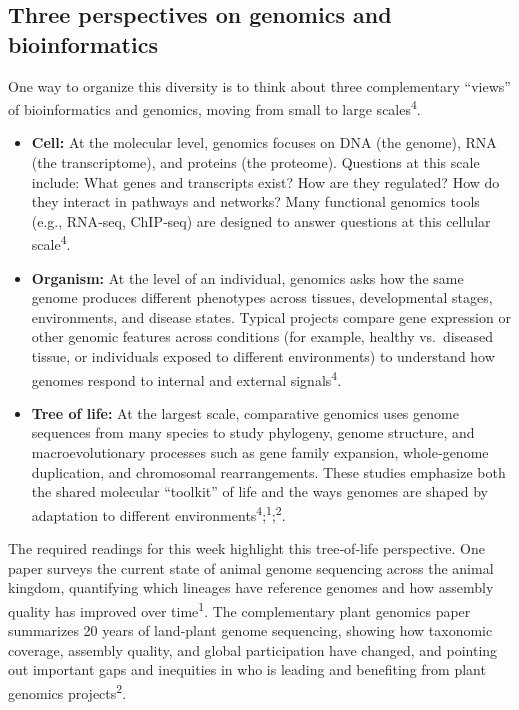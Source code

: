\documentclass[
  letterpaper,
  DIV=11,
  numbers=noendperiod]{scrreprt}
\begin{document}
\subsection{Three perspectives on genomics and
bioinformatics}\label{three-perspectives-on-genomics-and-bioinformatics}

One way to organize this diversity is to think about three complementary
``views'' of bioinformatics and genomics, moving from small to large
scales\textsuperscript{4}.

\begin{itemize}
\item
  \textbf{Cell:} At the molecular level, genomics focuses on DNA (the
  genome), RNA (the transcriptome), and proteins (the proteome).
  Questions at this scale include: What genes and transcripts exist? How
  are they regulated? How do they interact in pathways and networks?
  Many functional genomics tools (e.g., RNA‑seq, ChIP‑seq) are designed
  to answer questions at this cellular scale\textsuperscript{4}.
\item
  \textbf{Organism:} At the level of an individual, genomics asks how
  the same genome produces different phenotypes across tissues,
  developmental stages, environments, and disease states. Typical
  projects compare gene expression or other genomic features across
  conditions (for example, healthy vs.~diseased tissue, or individuals
  exposed to different environments) to understand how genomes respond
  to internal and external signals\textsuperscript{4}.
\item
  \textbf{Tree of life:} At the largest scale, comparative genomics uses
  genome sequences from many species to study phylogeny, genome
  structure, and macroevolutionary processes such as gene family
  expansion, whole‑genome duplication, and chromosomal rearrangements.
  These studies emphasize both the shared molecular ``toolkit'' of life
  and the ways genomes are shaped by adaptation to different
  environments\textsuperscript{4};\textsuperscript{1};\textsuperscript{2}.
\end{itemize}

The required readings for this week highlight this tree‑of‑life
perspective. One paper surveys the current state of animal genome
sequencing across the animal kingdom, quantifying which lineages have
reference genomes and how assembly quality has improved over
time\textsuperscript{1}. The complementary plant genomics paper
summarizes 20 years of land‑plant genome sequencing, showing how
taxonomic coverage, assembly quality, and global participation have
changed, and pointing out important gaps and inequities in who is
leading and benefiting from plant genomics projects\textsuperscript{2}.
\end{document}
